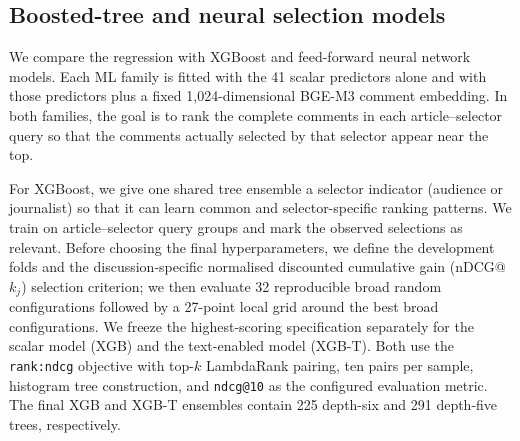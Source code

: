 \subsection{Boosted-tree and neural selection models}
We compare the regression with XGBoost \citep{chen2016xgboost} and feed-forward neural network models. Each ML family is fitted with the 41 scalar predictors alone and with those predictors plus a fixed 1,024-dimensional BGE-M3 comment embedding. In both families, the goal is to rank the complete comments in each article--selector query so that the comments actually selected by that selector appear near the top.

For XGBoost, we give one shared tree ensemble a selector indicator (audience or journalist) so that it can learn common and selector-specific ranking patterns. We train on article--selector query groups and mark the observed selections as relevant. Before choosing the final hyperparameters, we define the development folds and the discussion-specific normalised discounted cumulative gain (nDCG@$k_j$) selection criterion; we then evaluate 32 reproducible broad random configurations followed by a 27-point local grid around the best broad configurations. We freeze the highest-scoring specification separately for the scalar model (XGB) and the text-enabled model (XGB-T). Both use the \texttt{rank:ndcg} objective with top-$k$ LambdaRank pairing, ten pairs per sample, histogram tree construction, and \texttt{ndcg@10} as the configured evaluation metric. The final XGB and XGB-T ensembles contain 225 depth-six and 291 depth-five trees, respectively.

